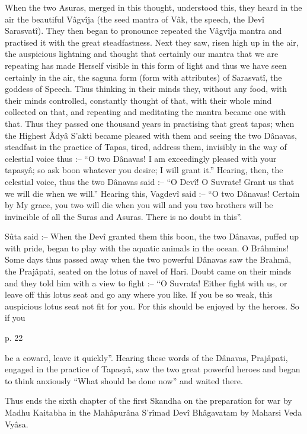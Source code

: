 When the two Asuras, merged in this thought, understood this, they heard in the air the beautiful Vâgvîja (the seed mantra of Vâk, the speech, the Devî Sarasvatî). They then began to pronounce repeated the Vâgvîja mantra and practised it with the great steadfastness. Next they saw, risen high up in the air, the auspicious lightning and thought that certainly our mantra that we are repeating has made Herself visible in this form of light and thus we have seen certainly in the air, the saguna form (form with attributes) of Sarasvatî, the goddess of Speech. Thus thinking in their minds they, without any food, with their minds controlled, constantly thought of that, with their whole mind collected on that, and repeating and meditating the mantra became one with that. Thus they passed one thousand years in practising that great tapas; when the Highest Âdyâ S’akti became pleased with them and seeing the two Dânavas, steadfast in the practice of Tapas, tired, address them, invisibly in the way of celestial voice thus :-- “O two Dânavas! I am exceedingly pleased with your tapasyâ; so ask boon whatever you desire; I will grant it.” Hearing, then, the celestial voice, thus the two Dânavas said :-- “O Devî! O Suvrate! Grant us that we will die when we will.” Hearing this, Vagdevî said :-- “O two Dânavas! Certain by My grace, you two will die when you will and you two brothers will be invincible of all the Suras and Asuras. There is no doubt in this”.

 

Sûta said :-- When the Devî granted them this boon, the two Dânavas, puffed up with pride, began to play with the aquatic animals in the ocean. O Brâhmins! Some days thus passed away when the two powerful Dânavas saw the Brahmâ, the Prajâpati, seated on the lotus of navel of Hari. Doubt came on their minds and they told him with a view to fight :-- “O Suvrata! Either fight with us, or leave off this lotus seat and go any where you like. If you be so weak, this auspicious lotus seat not fit for you. For this should be enjoyed by the heroes. So if you

 

p. 22

 

be a coward, leave it quickly”. Hearing these words of the Dânavas, Prajâpati, engaged in the practice of Tapasyâ, saw the two great powerful heroes and began to think anxiously “What should be done now” and waited there.

 

Thus ends the sixth chapter of the first Skandha on the preparation for war by Madhu Kaitabha in the Mahâpurâna S’rîmad Devî Bhâgavatam by Maharsi Veda Vyâsa.
